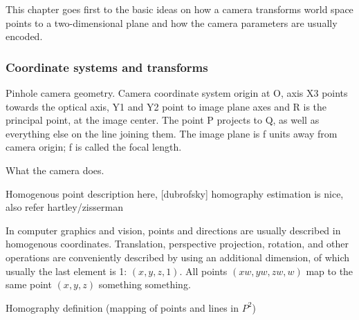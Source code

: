 This chapter goes first to the basic ideas on how a camera transforms world space points to a two-dimensional plane and how the camera parameters are usually encoded.

\subsubsection{Coordinate systems and transforms}

{Pinhole camera geometry. Camera coordinate system origin at O, axis X3 points towards the optical axis, Y1 and Y2 point to image plane axes and R is the principal point, at the image center. The point P projects to Q, as well as everything else on the line joining them. The image plane is f units away from camera origin; f is called the focal length.}

What the camera does.

Homogenous point description here, [dubrofsky] homography estimation is nice, also refer hartley/zisserman

In computer graphics and vision, points and directions are usually described in homogenous coordinates. Translation, perspective projection, rotation, and other operations are conveniently described by using an additional dimension, of which usually the last element is 1: $(x, y, z, 1)$. All points $(xw, yw, zw, w)$ map to the same point $(x, y, z)$ something something.

Homography definition (mapping of points and lines in $P^2$)

